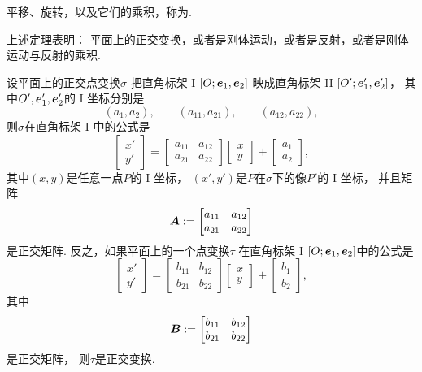 平移、旋转，以及它们的乘积，称为.

上述定理表明：
平面上的正交变换，或者是刚体运动，或者是反射，或者是刚体运动与反射的乘积.

\begin{theorem}
设平面上的正交点变换\(\sigma\)
把直角标架 I \([O;\boldsymbol{e}_1,\boldsymbol{e}_2]\)
映成直角标架 II \([O';\boldsymbol{e}'_1,\boldsymbol{e}'_2]\)，
其中\(O',\boldsymbol{e}'_1,\boldsymbol{e}'_2\)的 I 坐标分别是\begin{equation*}
	(a_1,a_2),
	\qquad
	(a_{11},a_{21}),
	\qquad
	(a_{12},a_{22}),
\end{equation*}
则\(\sigma\)在直角标架 I 中的公式是\begin{equation*}
	\begin{bmatrix}
		x' \\ y'
	\end{bmatrix}
	= \begin{bmatrix}
		a_{11} & a_{12} \\
		a_{21} & a_{22}
	\end{bmatrix}
	\begin{bmatrix}
		x \\ y
	\end{bmatrix}
	+ \begin{bmatrix}
		a_1 \\ a_2
	\end{bmatrix},
\end{equation*}
其中\((x,y)\)是任意一点\(P\)的 I 坐标，
\((x',y')\)是\(P\)在\(\sigma\)下的像\(P'\)的 I 坐标，
并且矩阵\begin{equation*}
	\boldsymbol{A} := \begin{bmatrix}
		a_{11} & a_{12} \\
		a_{21} & a_{22}
	\end{bmatrix}
\end{equation*}
是正交矩阵.
反之，如果平面上的一个点变换\(\tau\)
在直角标架 I \([O;\boldsymbol{e}_1,\boldsymbol{e}_2]\)中的公式是\begin{equation*}
	\begin{bmatrix}
		x' \\ y'
	\end{bmatrix}
	= \begin{bmatrix}
		b_{11} & b_{12} \\
		b_{21} & b_{22}
	\end{bmatrix}
	\begin{bmatrix}
		x \\ y
	\end{bmatrix}
	+ \begin{bmatrix}
		b_1 \\ b_2
	\end{bmatrix},
\end{equation*}
其中\begin{equation*}
	\boldsymbol{B} := \begin{bmatrix}
		b_{11} & b_{12} \\
		b_{21} & b_{22}
	\end{bmatrix}
\end{equation*}
是正交矩阵，
则\(\tau\)是正交变换.
\end{theorem}

